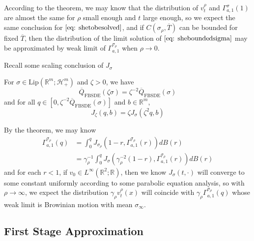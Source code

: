 According to the theorem, we may know that the distribution of $v_t^{\rho}$ and $\Gamma^{\sigma}_{a,1}(1)$ are almost the same for $\rho$ small enough and $t$ large enough, so we expect the same conclusion for $\eqref{eq: shetobesolved}$, and if $C(\sigma_{\rho},\overline{T})$ can be bounded for fixed $\overline{T}$, then the distribution of the limit solution of $\eqref{eq: sheboundedsigma}$ may be approximated by weak limit of $\Gamma^{\sigma_{\rho}}_{a,1}$ when $\rho\to 0$.

Recall some scaling conclusion of $J_{\sigma}$
\begin{proposition}
    For $\sigma \in \text{Lip}(\mathbb{R}^m;\mathcal{H}^m_+)$ and $\zeta > 0$, we have
    \[\overline{Q}_{\text{FBSDE}}(\zeta \sigma) = \zeta^{-2}\overline{Q}_{\text{FBSDE}}(\sigma)
    \]
    and for all $q\in [0,\zeta^{-2}\overline{Q}_{\text{FBSDE}}(\sigma)]$ and $b\in\mathbb{R}^m$,
    \[J_{\zeta}(q,b) = \zeta J_{\sigma}(\zeta^2 q,b)\]
\end{proposition}

By the theorem, we may know
\[
\begin{aligned}
    \Gamma^{\sigma_{\rho}}_{a,1}(q) &= \int_0^q J_{\sigma_{\rho}}(1-r,\Gamma^{\sigma_{\rho}}_{a,1}(r))dB(r) \\
    &= \gamma_{\rho}^{-1}\int_0^q J_{\sigma}(\gamma_{\rho}^{-2}(1-r),\Gamma_{a,1}^{\sigma_{\rho}}(r))dB(r)
\end{aligned}
\]
and for each $r < 1$, if $v_0 \in L^{\infty}(\mathbb{R}^2;\mathbb{R})$, then we know $J_{\sigma}(t,\cdot)$ will converge to some constant uniformly according to some parabolic equation analysis, so with $\rho \to \infty$, we expect the distribution $\gamma_{\rho}v^{\rho}_t(x)$ will coincide with $\gamma_{\rho}\Gamma^{\sigma_{\rho}}_{a,1}(q)$ whose weak limit is Browinian motion with mean $\sigma_{\infty}$.

\subsection{First Stage Approximation}

